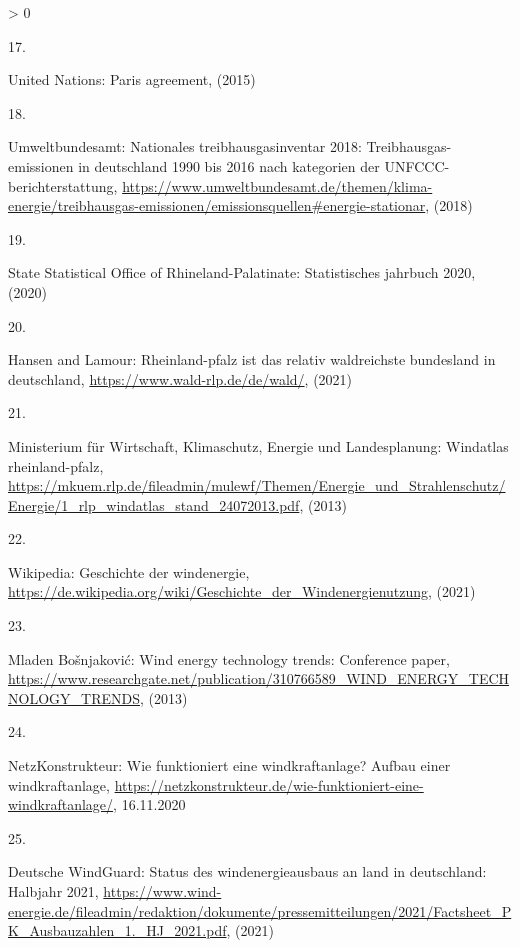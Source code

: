 \documentclass[a4paper,11pt]{article}
\newlength{\cslhangindent}
\newlength{\csllabelwidth}
\newenvironment{CSLReferences}[3] %
 {%
  \setlength{\parindent}{0pt}
  \ifodd #1 \everypar{\setlength{\hangindent}{\cslhangindent}}\ignorespaces\fi
  \ifnum #2 > 0
  \setlength{\parskip}{#2\baselineskip}
  \fi
 }%
 {}
\newcommand{\CSLLeftMargin}[1]{\parbox[t]{\maxof{\widthof{#1}}{\csllabelwidth}}{#1}}
\newcommand{\CSLRightInline}[1]{\parbox[t]{\linewidth}{#1}}
\begin{document}
\begin{CSLReferences}{0}{0}
\leavevmode\hypertarget{ref-UnitedNations.2015}{}%
\CSLLeftMargin{17. }
\CSLRightInline{United Nations: Paris agreement, (2015)}

\leavevmode\hypertarget{ref-Umweltbundesamt.2018}{}%
\CSLLeftMargin{18. }
\CSLRightInline{Umweltbundesamt: Nationales treibhausgasinventar 2018: Treibhausgas-emissionen in deutschland 1990 bis 2016 nach kategorien der UNFCCC-berichterstattung, \url{https://www.umweltbundesamt.de/themen/klima-energie/treibhausgas-emissionen/emissionsquellen\#energie-stationar}, (2018)}

\leavevmode\hypertarget{ref-StateStatisticalOfficeofRhinelandPalatinate.2020}{}%
\CSLLeftMargin{19. }
\CSLRightInline{State Statistical Office of Rhineland-Palatinate: Statistisches jahrbuch 2020, (2020)}

\leavevmode\hypertarget{ref-HansenandLamour.2021}{}%
\CSLLeftMargin{20. }
\CSLRightInline{Hansen and Lamour: Rheinland-pfalz ist das relativ waldreichste bundesland in deutschland, \url{https://www.wald-rlp.de/de/wald/}, (2021)}

\leavevmode\hypertarget{ref-MinisteriumfurWirtschaftKlimaschutzEnergieundLandesplanung.2013}{}%
\CSLLeftMargin{21. }
\CSLRightInline{Ministerium für Wirtschaft, Klimaschutz, Energie und Landesplanung: Windatlas rheinland-pfalz, \url{https://mkuem.rlp.de/fileadmin/mulewf/Themen/Energie_und_Strahlenschutz/Energie/1_rlp_windatlas_stand_24072013.pdf}, (2013)}

\leavevmode\hypertarget{ref-Wikipedia.2021}{}%
\CSLLeftMargin{22. }
\CSLRightInline{Wikipedia: Geschichte der windenergie, \url{https://de.wikipedia.org/wiki/Geschichte_der_Windenergienutzung}, (2021)}

\leavevmode\hypertarget{ref-MladenBosnjakovic.2013}{}%
\CSLLeftMargin{23. }
\CSLRightInline{Mladen Bošnjaković: Wind energy technology trends: Conference paper, \url{https://www.researchgate.net/publication/310766589_WIND_ENERGY_TECHNOLOGY_TRENDS}, (2013)}

\leavevmode\hypertarget{ref-NetzKonstrukteur.16.11.2020}{}%
\CSLLeftMargin{24. }
\CSLRightInline{NetzKonstrukteur: Wie funktioniert eine windkraftanlage? Aufbau einer windkraftanlage, \url{https://netzkonstrukteur.de/wie-funktioniert-eine-windkraftanlage/}, 16.11.2020}

\leavevmode\hypertarget{ref-DeutscheWindGuard.2021}{}%
\CSLLeftMargin{25. }
\CSLRightInline{Deutsche WindGuard: Status des windenergieausbaus an land in deutschland: Halbjahr 2021, \url{https://www.wind-energie.de/fileadmin/redaktion/dokumente/pressemitteilungen/2021/Factsheet_PK_Ausbauzahlen_1._HJ_2021.pdf}, (2021)}


\end{CSLReferences}
\end{document}

